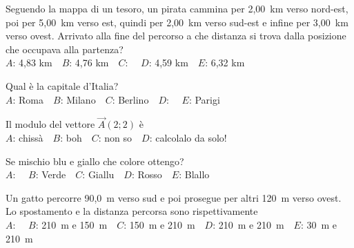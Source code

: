 \mcquestionheader Seguendo la mappa di un tesoro, un pirata cammina per 2,00~km verso nord-est, poi per 5,00~km verso est, quindi per 2,00~km verso sud-est e infine per 3,00~km verso ovest. Arrivato alla fine del percorso a che distanza si trova dalla posizione che occupava alla partenza?\\
{$A$}: 4,83 km\ \ {$B$}: 4,76 km\ \ {$C$}: \ \ {$D$}: 4,59 km\ \ {$E$}: 6,32 km\ \ 

\mcquestionfooter



\def\mcquestionnumber{5}


\mcquestionheader Qual è la capitale d’Italia?\\
{$A$}: Roma\ \ {$B$}: Milano\ \ {$C$}: Berlino\ \ {$D$}: \ \ {$E$}: Parigi\ \ 

\mcquestionfooter



\def\mcquestionnumber{6}


\mcquestionheader Il modulo del vettore $\vec{A}(2;2)$ è\\
{$A$}: chissà\ \ {$B$}: boh\ \ {$C$}: non so\ \ {$D$}: calcolalo da solo!\ \ 

\mcquestionfooter



\def\mcquestionnumber{7}


\mcquestionheader Se mischio blu e giallo che colore ottengo?\\
{$A$}: \ \ {$B$}: Verde\ \ {$C$}: Giallu\ \ {$D$}: Rosso\ \ {$E$}: Blallo\ \ 

\mcquestionfooter



\def\mcquestionnumber{8}


\mcquestionheader Un gatto percorre 90,0~m verso sud e poi prosegue per altri 120~m verso ovest. Lo spostamento e la distanza percorsa sono rispettivamente\\
{$A$}: \ \ {$B$}: 210~m e 150~m\ \ {$C$}: 150~m e 210~m\ \ {$D$}: 210~m e 210~m\ \ {$E$}: 30~m e 210~m\ \ 

\mcquestionfooter



\def\mcquestionnumber{9}


